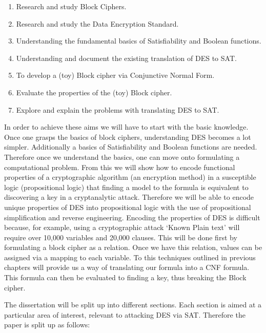 \documentclass[11pt,a4paper, notitlepage]{report}
\begin{document}
\begin{enumerate}
\item Research and study Block Ciphers.
\item Research and study the Data Encryption Standard.
\item Understanding the fundamental basics of Satisfiability and Boolean functions.
\item Understanding and document the existing translation of DES to SAT.
\item To develop a (toy) Block cipher via Conjunctive Normal Form.
\item Evaluate the properties of the (toy) Block cipher.
\item Explore and explain the problems with translating DES to SAT.
\end{enumerate}
In order to achieve these aims we will have to start with the basic knowledge. Once one grasps the basics of block ciphers, understanding DES becomes a lot simpler. Additionally a basics of Satisfiability and Boolean functions are needed. Therefore once we understand the basics, one can move onto formulating a computational problem. From this we will show how to encode functional properties of a cryptographic algorithm (an encryption method) in a susceptible logic (propositional logic) that finding a model to the formula is equivalent to discovering a key in a cryptanalytic attack. Therefore we will be able to encode unique properties of DES into propositional logic with the use of propositional simplification and reverse engineering. Encoding the properties of DES is difficult because, for example, using a cryptographic attack `Known Plain text' will require over 10,000 variables and 20,000 clauses. This will be done first by formulating a block cipher as a relation. Once we have this relation, values can be assigned via a mapping to each variable. To this techniques outlined in previous chapters will provide us a way of translating our formula into a CNF formula. This formula can then be evaluated to finding a key, thus breaking the Block cipher. 

The dissertation will be split up into different sections. Each section is aimed at a particular area of interest, relevant to attacking DES via SAT. Therefore the paper is split up as follows: 
\end{document}
